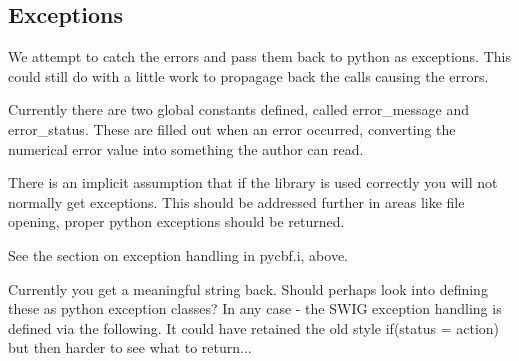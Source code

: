 \documentclass[10pt,a4paper,twoside,notitlepage]{article}
\begin{document}
\subsection{Exceptions}

We attempt to catch the errors and pass them back to python as 
exceptions. This could still do with a little work to propagage
back the calls causing the errors.

Currently there are two global  constants defined, called error\_message
and error\_status. 
These are filled out when an error occurred, converting the numerical
error value into something the author can read.

There is an implicit assumption that if the library is used 
correctly you will not normally get exceptions. 
This should be addressed further in areas like file opening,
proper python exceptions should be returned.

See the section on exception handling in pycbf.i, above.

Currently you get a meaningful string back. Should perhaps look into
defining these as python exception classes? 
In any case - the SWIG exception handling is defined via the following.
It could have retained the old style if(status = action) but then
harder to see what to return...
\end{document}
